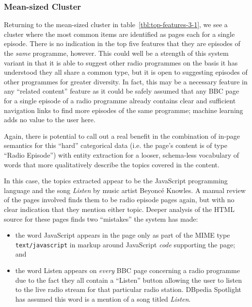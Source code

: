 \subsubsection{Mean-sized Cluster}

Returning to the mean-sized cluster in table~\ref{tbl:top-features-3-1},
we see a cluster where the most common items are identified as pages
each for a single episode. There is no indication in the top five
features that they are episodes of the \emph{same} programme, however.
This could well be a strength of this system variant in that it is
able to suggest other radio programmes on the basis it has understood
they all share a common type, but it is open to suggesting episodes
of other programmes for greater diversity. In fact, this may be a
necessary feature in any ``related content'' feature as it could
be safely assumed that any BBC page for a single episode of a radio
programme already contains clear and sufficient navigation links to
find more episodes of the same programme; machine learning adds no
value to the user here.

Again, there is potential to call out a real benefit in the
combination of in-page semantics for this ``hard'' categorical
data (i.e. the page's content is of type ``Radio Episode'') with
entity extraction for a looser, schema-less vocabulary of words that
more qualitatively describe the topics covered in the content.

In this case, the topics extracted appear to be the JavaScript
programming language and the song \emph{Listen} by music artist
Beyonc\'e Knowles. A manual review of the pages involved finds them
to be radio episode pages again, but with no clear indication that
they mention either topic. Deeper analysis of the HTML source for
these pages finds two ``mistakes'' the system has made:

\begin{itemize}
\item the word JavaScript appears in the page only as part of the
  MIME type \texttt{text/javascript} in markup around JavaScript
  \emph{code} supporting the page; and
\item the word Listen appears on \emph{every} BBC page concerning
  a radio programme due to the fact they all contain a ``Listen''
  button allowing the user to listen to the live radio stream for
  that particular radio station. DBpedia Spotlight has assumed this
  word is a mention of a song titled \emph{Listen}.
\end{itemize}


